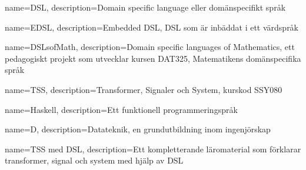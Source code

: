 {
    name=DSL,
    description={Domain specific language eller domänspecifikt språk}
}

{
    name=EDSL,
    description={Embedded DSL, DSL som är inbäddat i ett värdspråk}
}

{
    name=DSLsofMath,
    description={Domain specific languages of Mathematics, ett pedagogiskt projekt som utvecklar kursen DAT325, Matematikens domänspecifika språk}
}


{
    name=TSS,
    description={Transformer, Signaler och System, kurskod SSY080}
}

{
	name=Haskell,
	description={Ett funktionell programmeringspråk}
}

{
    name=D,
    description={Datateknik, en grundutbildning inom ingenjörskap}
}

{
    name={TSS med DSL},
    description={Ett kompletterande läromaterial som förklarar transformer, signal och system med hjälp av DSL}
}